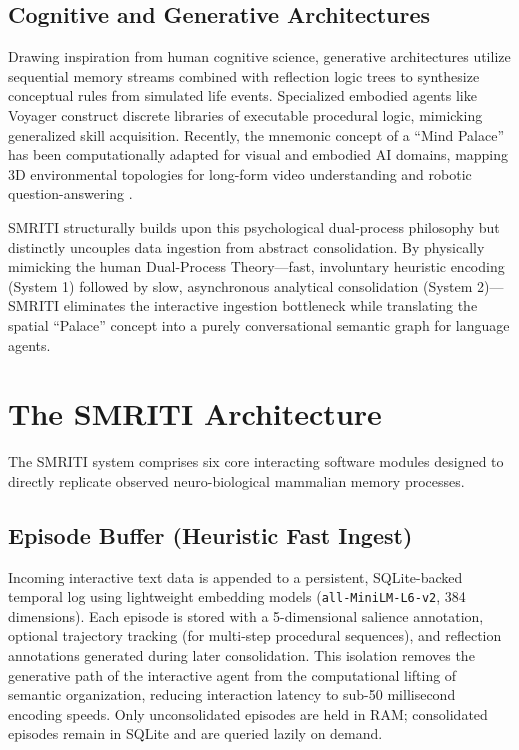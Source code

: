 \documentclass[conference]{IEEEtran}
\begin{document}
\subsection{Cognitive and Generative Architectures}
Drawing inspiration from human cognitive science, generative architectures \cite{park2023generative} utilize sequential memory streams combined with reflection logic trees to synthesize conceptual rules from simulated life events. Specialized embodied agents like Voyager \cite{wang2023voyager} construct discrete libraries of executable procedural logic, mimicking generalized skill acquisition. Recently, the mnemonic concept of a ``Mind Palace'' has been computationally adapted for visual and embodied AI domains, mapping 3D environmental topologies for long-form video understanding and robotic question-answering \cite{wang2025mindpalace, ginting2025mindpalace}.

SMRITI structurally builds upon this psychological dual-process philosophy \cite{kahneman2011thinking} but distinctly uncouples data ingestion from abstract consolidation. By physically mimicking the human Dual-Process Theory---fast, involuntary heuristic encoding (System 1) followed by slow, asynchronous analytical consolidation (System 2)---SMRITI eliminates the interactive ingestion bottleneck while translating the spatial ``Palace'' concept into a purely conversational semantic graph for language agents.

\section{The SMRITI Architecture}

The SMRITI system comprises six core interacting software modules designed to directly replicate observed neuro-biological mammalian memory processes.

\subsection{Episode Buffer (Heuristic Fast Ingest)}
Incoming interactive text data is appended to a persistent, SQLite-backed temporal log using lightweight embedding models (\texttt{all-MiniLM-L6-v2}, 384 dimensions). Each episode is stored with a 5-dimensional salience annotation, optional trajectory tracking (for multi-step procedural sequences), and reflection annotations generated during later consolidation. This isolation removes the generative path of the interactive agent from the computational lifting of semantic organization, reducing interaction latency to sub-50 millisecond encoding speeds. Only unconsolidated episodes are held in RAM; consolidated episodes remain in SQLite and are queried lazily on demand.
\end{document}
